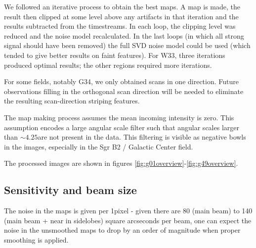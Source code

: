 \documentclass[twocolumn]{aastex62}
\def\todo#1{{\textcolor{red}{TODO: #1}}}
\begin{document}
We followed an iterative process to obtain the best maps.  A map is made, the
result then clipped at some level above any artifacts in that iteration and the
results subtracted from the timestreams.  In each loop, the clipping level was
reduced and the noise model recalculated.  In the last loops (in which all
strong signal should have been removed) the full SVD noise model could be used
(which tended to give better results on faint features). For W33, three
iterations produced optimal results; the other regions required more
iterations.

For some fields, notably G34, we only obtained scans in one direction.  Future
observations filling in the orthogonal scan direction will be needed to eliminate
the resulting scan-direction striping features.

The map making process assumes the mean incoming intensity is zero.  This
assumption encodes a large angular scale filter such that angular scales larger
than $\sim4.25$\arcmin are not present in the data.  This filtering is visible
as negative bowls in the images, especially in the Sgr B2 / Galactic Center
field.

The processed images are shown in figures
\ref{fig:g01overview}-\ref{fig:g49overview}.

\subsection{Sensitivity and beam size}

The noise in the maps is given per 1\arcsec pixel - given there are 80 (main
beam) to 140 (main beam + near in sidelobes) square arcseconds per beam, one can
expect the noise in the unsmoothed maps to drop by an order of magnitude when
proper smoothing is applied. 
\end{document}
